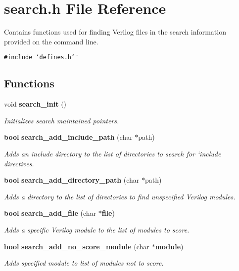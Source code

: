 \section{search.h File Reference}
\label{search_8h}
Contains functions used for finding Verilog files in the search information provided on the command line. 


{\tt \#include \char`\"{}defines.h\char`\"{}}\par
\subsection*{Functions}
\begin{CompactItemize}
\item 
void {\bf search\_\-init} ()
\begin{CompactList}\small\item\em Initializes search maintained pointers.\item\end{CompactList}\item 
{\bf bool} {\bf search\_\-add\_\-include\_\-path} (char $\ast$path)
\begin{CompactList}\small\item\em Adds an include directory to the list of directories to search for `include directives.\item\end{CompactList}\item 
{\bf bool} {\bf search\_\-add\_\-directory\_\-path} (char $\ast$path)
\begin{CompactList}\small\item\em Adds a directory to the list of directories to find unspecified Verilog modules.\item\end{CompactList}\item 
{\bf bool} {\bf search\_\-add\_\-file} (char $\ast${\bf file})
\begin{CompactList}\small\item\em Adds a specific Verilog module to the list of modules to score.\item\end{CompactList}\item 
{\bf bool} {\bf search\_\-add\_\-no\_\-score\_\-module} (char $\ast${\bf module})
\begin{CompactList}\small\item\em Adds specified module to list of modules not to score.\item\end{CompactList}\item 

\end{CompactItemize}
